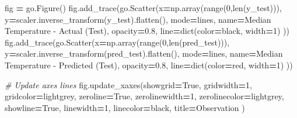 \documentclass[
  a4paper,
  DIV=11,
  numbers=noendperiod]{scrreprt}
\newenvironment{Shaded}{\begin{snugshade}}{\end{snugshade}}
\newcommand{\BuiltInTok}[1]{#1}
\newcommand{\CommentTok}[1]{\textcolor[rgb]{0.56,0.35,0.01}{\textit{#1}}}
\newcommand{\DecValTok}[1]{\textcolor[rgb]{0.00,0.00,0.81}{#1}}
\newcommand{\FloatTok}[1]{\textcolor[rgb]{0.00,0.00,0.81}{#1}}
\newcommand{\NormalTok}[1]{#1}
\newcommand{\OperatorTok}[1]{\textcolor[rgb]{0.81,0.36,0.00}{\textbf{#1}}}
\newcommand{\StringTok}[1]{\textcolor[rgb]{0.31,0.60,0.02}{#1}}
\newcommand{\VariableTok}[1]{\textcolor[rgb]{0.00,0.00,0.00}{#1}}
\begin{document}
\begin{Shaded}
\begin{Highlighting}[numbers=left,,]
\NormalTok{fig }\OperatorTok{=}\NormalTok{ go.Figure()}
\NormalTok{fig.add\_trace(go.Scatter(x}\OperatorTok{=}\NormalTok{np.array(}\BuiltInTok{range}\NormalTok{(}\DecValTok{0}\NormalTok{,}\BuiltInTok{len}\NormalTok{(y\_test))),}
\NormalTok{                         y}\OperatorTok{=}\NormalTok{scaler.inverse\_transform(y\_test).flatten(),}
\NormalTok{                         mode}\OperatorTok{=}\StringTok{\textquotesingle{}lines\textquotesingle{}}\NormalTok{,}
\NormalTok{                         name}\OperatorTok{=}\StringTok{\textquotesingle{}Median Temperature {-} Actual (Test)\textquotesingle{}}\NormalTok{,}
\NormalTok{                         opacity}\OperatorTok{=}\FloatTok{0.8}\NormalTok{,}
\NormalTok{                         line}\OperatorTok{=}\BuiltInTok{dict}\NormalTok{(color}\OperatorTok{=}\StringTok{\textquotesingle{}black\textquotesingle{}}\NormalTok{, width}\OperatorTok{=}\DecValTok{1}\NormalTok{)}
\NormalTok{                        ))}
\NormalTok{fig.add\_trace(go.Scatter(x}\OperatorTok{=}\NormalTok{np.array(}\BuiltInTok{range}\NormalTok{(}\DecValTok{0}\NormalTok{,}\BuiltInTok{len}\NormalTok{(pred\_test))),}
\NormalTok{                         y}\OperatorTok{=}\NormalTok{scaler.inverse\_transform(pred\_test).flatten(),}
\NormalTok{                         mode}\OperatorTok{=}\StringTok{\textquotesingle{}lines\textquotesingle{}}\NormalTok{,}
\NormalTok{                         name}\OperatorTok{=}\StringTok{\textquotesingle{}Median Temperature {-} Predicted (Test)\textquotesingle{}}\NormalTok{,}
\NormalTok{                         opacity}\OperatorTok{=}\FloatTok{0.8}\NormalTok{,}
\NormalTok{                         line}\OperatorTok{=}\BuiltInTok{dict}\NormalTok{(color}\OperatorTok{=}\StringTok{\textquotesingle{}red\textquotesingle{}}\NormalTok{, width}\OperatorTok{=}\DecValTok{1}\NormalTok{)}
\NormalTok{                        ))}

\CommentTok{\# Update axes lines}
\NormalTok{fig.update\_xaxes(showgrid}\OperatorTok{=}\VariableTok{True}\NormalTok{, gridwidth}\OperatorTok{=}\DecValTok{1}\NormalTok{, gridcolor}\OperatorTok{=}\StringTok{\textquotesingle{}lightgrey\textquotesingle{}}\NormalTok{,}
\NormalTok{                 zeroline}\OperatorTok{=}\VariableTok{True}\NormalTok{, zerolinewidth}\OperatorTok{=}\DecValTok{1}\NormalTok{, zerolinecolor}\OperatorTok{=}\StringTok{\textquotesingle{}lightgrey\textquotesingle{}}\NormalTok{,}
\NormalTok{                 showline}\OperatorTok{=}\VariableTok{True}\NormalTok{, linewidth}\OperatorTok{=}\DecValTok{1}\NormalTok{, linecolor}\OperatorTok{=}\StringTok{\textquotesingle{}black\textquotesingle{}}\NormalTok{,}
\NormalTok{                 title}\OperatorTok{=}\StringTok{\textquotesingle{}Observation\textquotesingle{}}
\NormalTok{                )}


\end{Highlighting}
\end{Shaded}
\end{document}
